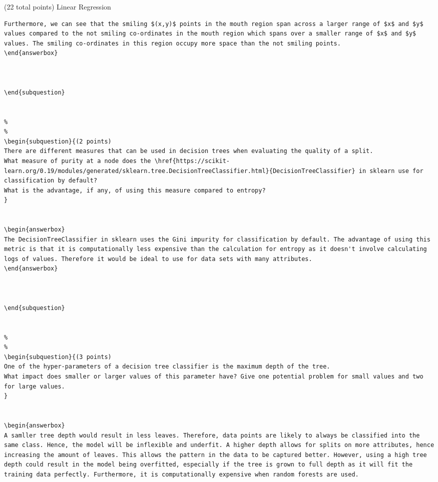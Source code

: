 \documentclass[12pt]{article}
\begin{document}
\begin{question}{(22 total points) Linear Regression}
\begin{subquestion}
\begin{answerbox}{20em}
\begin {verbatim}
Furthermore, we can see that the smiling $(x,y)$ points in the mouth region span across a larger range of $x$ and $y$ values compared to the not smiling co-ordinates in the mouth region which spans over a smaller range of $x$ and $y$ values. The smiling co-ordinates in this region occupy more space than the not smiling points.
\end{answerbox}



\end{subquestion}


%
%
\begin{subquestion}{(2 points) 
There are different measures that can be used in decision trees when evaluating the quality of a split. 
What measure of purity at a node does the \href{https://scikit-learn.org/0.19/modules/generated/sklearn.tree.DecisionTreeClassifier.html}{DecisionTreeClassifier} in sklearn use for classification by default? 
What is the advantage, if any, of using this measure compared to entropy? 
}


\begin{answerbox}{10em}
The DecisionTreeClassifier in sklearn uses the Gini impurity for classification by default. The advantage of using this metric is that it is computationally less expensive than the calculation for entropy as it doesn't involve calculating logs of values. Therefore it would be ideal to use for data sets with many attributes.
\end{answerbox}



\end{subquestion}


%
%
\begin{subquestion}{(3 points) 
One of the hyper-parameters of a decision tree classifier is the maximum depth of the tree. 
What impact does smaller or larger values of this parameter have? Give one potential problem for small values and two for large values. 
}


\begin{answerbox}{10em}
A samller tree depth would result in less leaves. Therefore, data points are likely to always be classified into the same class. Hence, the model will be inflexible and underfit. A higher depth allows for splits on more attributes, hence increasing the amount of leaves. This allows the pattern in the data to be captured better. However, using a high tree depth could result in the model being overfitted, especially if the tree is grown to full depth as it will fit the training data perfectly. Furthermore, it is computationally expensive when random forests are used.



\end{verbatim}
\end{answerbox}
\end{subquestion}
\end{question}
\end{document}
